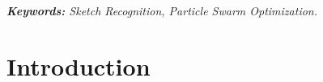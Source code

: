 \documentclass[preprint,1p,times,review]{elsarticle}
\begin{document}
\maketitle
%
%
%
%

%
%
\textit{\textbf{Keywords:} Sketch Recognition, Particle Swarm Optimization.}
 \section{Introduction}
\end{document}

